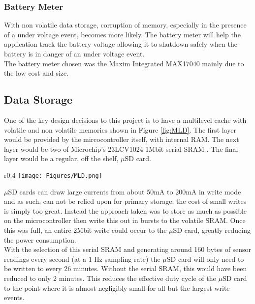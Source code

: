 \documentclass[12pt,openany,a4paper]{book}
\begin{document}
			
			\subsubsection{Battery Meter}
			With non volatile data storage, corruption of memory, especially in the presence of a under voltage event, becomes more likely. The battery meter will help the application track the battery voltage allowing it to shutdown safely when the battery is in danger of an under voltage event. \\
			
			
			The battery meter chosen was the Maxim Integrated MAX17040 \cite{max17} mainly due to the low cost and size. %
			
		\newpage
		\subsection{Data Storage}
		One of the key design decisions to this project is to have a multilevel cache with volatile and non volatile memories shown in Figure \ref{fig:MLD}. The first layer would be provided by the mircocontroller itself, with internal RAM. The next layer would be two of Microchip's 23LCV1024 1Mbit serial SRAM \cite{MICRAM}. The final layer would be a regular, off the shelf, $\mu$SD card. \\
				
				\begin{wrapfigure}{r}{0.4\textwidth}
					\centering
					\texttt{[image: Figures/MLD.png]}
					\caption{Memory Architecture}
					\label{fig:MLD}
				\end{wrapfigure}
		
		$\mu$SD cards can draw large currents from about 50mA to 200mA in write mode \cite{Sandisk} and as such, can not be relied upon for primary storage; the cost of small writes is simply too great. Instead the approach taken was to store as much as possible on the microcontroller then write this out in bursts to the volatile SRAM. Once this was full, an entire 2Mbit write could occur to the $\mu$SD card, greatly reducing the power consumption. \\
		
		With the selection of this serial SRAM and generating around 160 bytes of sensor readings every second (at a 1 Hz sampling rate) the $\mu$SD card will only need to be written to every 26 minutes. Without the serial SRAM, this would have been reduced to only 2 minutes. This reduces the effective duty cycle of the $\mu$SD card to the point where it is almost negligibly small for all but the largest write events.
		
\end{document}
